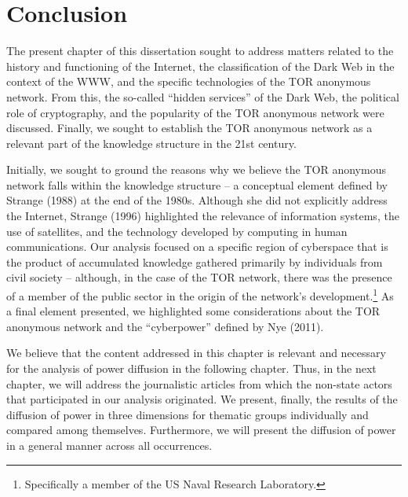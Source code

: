 \section{Conclusion}

The present chapter of this dissertation sought to address matters related to the history and functioning of the Internet, the classification of the Dark Web in the context of the WWW, and the specific technologies of the TOR anonymous network. From this, the so-called ``hidden services'' of the Dark Web, the political role of cryptography, and the popularity of the TOR anonymous network were discussed. Finally, we sought to establish the TOR anonymous network as a relevant part of the knowledge structure in the 21st century.

Initially, we sought to ground the reasons why we believe the TOR anonymous network falls within the knowledge structure -- a conceptual element defined by Strange (1988) at the end of the 1980s. Although she did not explicitly address the Internet, Strange (1996) highlighted the relevance of information systems, the use of satellites, and the technology developed by computing in human communications. Our analysis focused on a specific region of cyberspace that is the product of accumulated knowledge gathered primarily by individuals from civil society -- although, in the case of the TOR network, there was the presence of a member of the public sector in the origin of the network's development.\footnote{Specifically a member of the US Naval Research Laboratory.} As a final element presented, we highlighted some considerations about the TOR anonymous network and the ``cyberpower'' defined by Nye (2011).

We believe that the content addressed in this chapter is relevant and necessary for the analysis of power diffusion in the following chapter. Thus, in the next chapter, we will address the journalistic articles from which the non-state actors that participated in our analysis originated. We present, finally, the results of the diffusion of power in three dimensions for thematic groups individually and compared among themselves. Furthermore, we will present the diffusion of power in a general manner across all occurrences.
